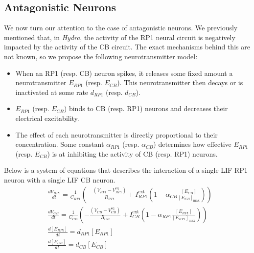 \documentclass{article}
\begin{document}
\newpage

\subsection{Antagonistic Neurons}
We now turn our attention to the case of antagonistic neurons. We previously mentioned that, in \textit{Hydra}, the activity of the RP1 neural circuit is negatively impacted by the activity of the CB circuit. The exact mechanisms behind this are not known, so we propose the following neurotransmitter model:
\begin{itemize}
    \item When an RP1 (resp. CB) neuron spikes, it releases some fixed amount a neurotransmitter $E_{RP1}$ (resp. $E_{CB}$). This neurotransmitter then decays or is inactivated at some rate $d_{RP1}$ (resp. $d_{CB}$).
    \item $E_{RP1}$ (resp. $E_{CB}$) binds to CB (resp. RP1) neurons and decreases their electrical excitability.
    \item The effect of each neurotransmitter is directly proportional to their concentration. Some constant $\alpha_{RP1}$ (resp. $\alpha_{CB}$) determines how effective $E_{RP1}$ (resp. $E_{CB}$) is at inhibiting the activity of CB (resp. RP1) neurons.
\end{itemize}
Below is a system of equations that describes the interaction of a single LIF RP1 neuron with a single LIF CB neuron.
\begin{align}
&\frac{dV_{RP1}}{dt}=\frac{1}{C_{RP1}}\left(-\frac{(V_{RP1}-V_{RP1}^{\mathrm{eq}})}{R_{RP1}}+I_{RP1}^{\mathrm{ext}}\left(1-\alpha_{CB}\frac{\left[E_{CB}\right]}{\left[E_{CB}\right]_{\max}}\right)\right)\\
&\frac{dV_{CB}}{dt}=\frac{1}{C_{CB}}\left(-\frac{(V_{CB}-V_{CB}^{\mathrm{eq}})}{R_{CB}}+I_{CB}^{\mathrm{ext}}\left(1-\alpha_{RP1}\frac{\left[E_{RP1}\right]}{\left[E_{RP1}\right]_{\max}}\right)\right)\\
&\frac{d\left[E_{RP1}\right]}{dt}=d_{RP1}\left[E_{RP1}\right]\\&\frac{d\left[E_{CB}\right]}{dt}=d_{CB}\left[E_{CB}\right]
\end{align}
\end{document}
